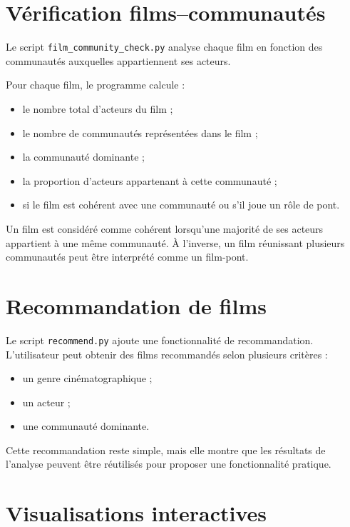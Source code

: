 \documentclass[11pt,a4paper,oneside,openany]{report}
\begin{document}
\section{Vérification films--communautés}

Le script \texttt{film\_community\_check.py} analyse chaque film en fonction des communautés auxquelles appartiennent ses acteurs.

Pour chaque film, le programme calcule :

\begin{itemize}
    \item le nombre total d’acteurs du film ;
    \item le nombre de communautés représentées dans le film ;
    \item la communauté dominante ;
    \item la proportion d’acteurs appartenant à cette communauté ;
    \item si le film est cohérent avec une communauté ou s’il joue un rôle de pont.
\end{itemize}

Un film est considéré comme cohérent lorsqu’une majorité de ses acteurs appartient à une même communauté. À l’inverse, un film réunissant plusieurs communautés peut être interprété comme un film-pont.

\section{Recommandation de films}

Le script \texttt{recommend.py} ajoute une fonctionnalité de recommandation. L’utilisateur peut obtenir des films recommandés selon plusieurs critères :

\begin{itemize}
    \item un genre cinématographique ;
    \item un acteur ;
    \item une communauté dominante.
\end{itemize}

Cette recommandation reste simple, mais elle montre que les résultats de l’analyse peuvent être réutilisés pour proposer une fonctionnalité pratique.

\section{Visualisations interactives}
\end{document}
